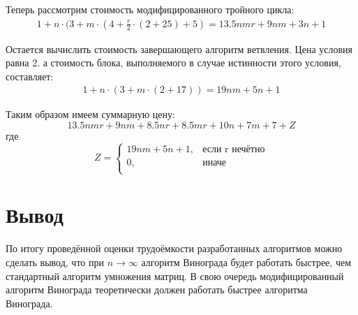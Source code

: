 Теперь рассмотрим стоимость модифицированного тройного цикла:
\begin{equation}
    \begin{gathered}
        1 + n \cdot{} (3 + m \cdot{} (4 + \frac{r}{2} \cdot{} (2 + 25) + 5) = 13.5nmr + 9nm + 3n + 1
    \end{gathered}
\end{equation}

Остается вычислить стоимость завершающего алгоритм ветвления. Цена условия равна 2. а стоимость блока, выполняемого в случае истинности этого условия, составляет:
\begin{equation}
    \begin{gathered}
        1 + n \cdot{} (3 + m \cdot{} (2 + 17)) = 19nm + 5n + 1
    \end{gathered}
\end{equation}

Таким образом имеем суммарную цену:
\begin{equation}
    13.5nmr + 9nm + 8.5nr + 8.5mr + 10n + 7m + 7 + Z
\end{equation}
где
\begin{equation}
Z = \left\{ \begin{array}{ll}
 19nm + 5n + 1, & \textrm{если r нечётно}\\
 0, & \textrm{иначе}\\
\end{array} \right.
\end{equation}

\section{Вывод}
По итогу проведённой оценки трудоёмкости разработанных алгоритмов можно сделать вывод, что при $n \to{} \infty{}$ алгоритм Винограда будет работать быстрее, чем стандартный алгоритм умножения матриц. В свою очередь модифицированный алгоритм Винограда теоретически должен работать быстрее алгоритма Винограда.

